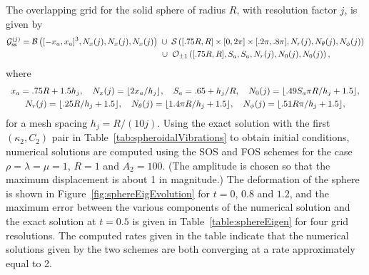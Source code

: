 The overlapping grid for the solid sphere of radius $R$, with resolution factor $j$, is given by
\begin{align*}
   \mathcal{G}_{{\rm ss}}^{(j)} = \mathcal B\left([-x_a,x_a]\sp3,N_x(j),N_x(j),N_x(j)\right)
   &\;\cup\; \mathcal S\left([.75R,R]\times[0,2\pi]\times[.2\pi,.8\pi],N_r(j),N_\theta(j),N_\phi(j)\right)\\
            &  ~\cup~ \mathcal O_{\pm1}\left([.75R,R],S_a,S_a,N_r(j),N_0(j),N_0(j)\right) , 
\end{align*}
where
\[
\begin{array}{c}
x_a=.75R+1.5 h_j, \quad N_x(j)=\lfloor 2 x_a/h_j \rfloor, \quad S_a=.65+ h_j/R, \quad N_0(j)=\lfloor .49S_a\pi R/h_j +1.5\rfloor,\smallskip\\
N_r(j)=\lfloor .25R/h_j+1.5\rfloor, \quad N_\theta(j)=\lfloor 1.4\pi R/h_j+1.5\rfloor, \quad
N_\phi(j)=\lfloor .51R\pi/h_j+1.5\rfloor,
\end{array}
\]
for a mesh spacing $h_j=R/(10j)$.  Using the exact solution with the first $(\kappa_2,C_2)$ pair in Table~\ref{tab:spheroidalVibrations} to obtain initial conditions, numerical solutions are computed using the SOS and FOS schemes for the case $\rho=\lambda=\mu=1$, $R=1$ and $A_2=100$.  (The amplitude is chosen so that the maximum displacement is about 1 in magnitude.)  The deformation of the sphere is shown in Figure~\ref{fig:sphereEigEvolution} for $t=0$, $0.8$ and $1.2$, and the maximum error between the various components of the numerical solution and the exact solution at $t=0.5$ is given in Table~\ref{table:sphereEigen} for four grid resolutions.  The computed rates given in the table indicate that the numerical solutions given by the two schemes are both converging at a rate approximately equal to 2.






